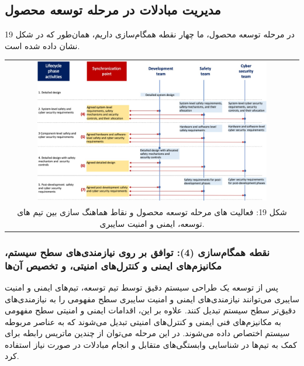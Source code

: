 \documentclass[a4paper,10pt]{article}
\begin{document}
        \subsection{مدیریت مبادلات در مرحله توسعه محصول}

            در مرحله توسعه محصول، ما چهار نقطه همگام‌سازی داریم، همان‌طور که در شکل 19 نشان داده شده است.

            \begin{table}
            
                \centering
                \begin{tabular}{ c }
                    
                    \includegraphics[width=0.8\textwidth]{Image/fig19.jpg} \\
    
                    شکل 19: فعالیت های مرحله توسعه محصول و نقاط هماهنگ سازی بین تیم های توسعه، ایمنی و امنیت سایبری.

                \end{tabular}
    
            \end{table}

            \subsubsection{نقطه همگام‌سازی (4): توافق بر روی نیازمندی‌های سطح سیستم، مکانیزم‌های ایمنی و کنترل‌های امنیتی، و تخصیص آن‌ها}

                پس از توسعه یک طراحی سیستم دقیق توسط تیم توسعه، تیم‌های ایمنی و امنیت سایبری می‌توانند نیازمندی‌های ایمنی و امنیت سایبری سطح مفهومی را به نیازمندی‌های دقیق‌تر سطح سیستم تبدیل کنند. علاوه بر این، اقدامات ایمنی و امنیتی سطح مفهومی به مکانیزم‌های فنی ایمنی و کنترل‌های امنیتی تبدیل می‌شوند که به عناصر مربوطه سیستم اختصاص داده می‌شوند. در این مرحله می‌توان از چندین ماتریس رابطه برای کمک به تیم‌ها در شناسایی وابستگی‌های متقابل و انجام مبادلات در صورت نیاز استفاده کرد.
\end{document}
